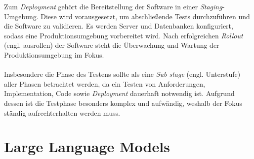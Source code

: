 Zum \textit{Deployment} gehört die Bereitstellung der Software in einer \textit{Staging}-Umgebung. Diese wird vorausgesetzt, um abschließende Tests durchzuführen und die Software zu validieren. Es werden Server und Datenbanken konfiguriert, sodass eine Produktionsumgebung vorbereitet wird. Nach erfolgreichen \textit{Rollout} (engl. ausrollen) der Software steht die Überwachung und Wartung der Produktionsumgebung im Fokus. \cite*{hossainSoftwareDevelopmentLife2023}\\\\
Insbesondere die Phase des Testens sollte als eine \textit{Sub stage} (engl. Unterstufe) aller Phasen betrachtet werden, da ein Testen von Anforderungen, Implementation, Code sowie \textit{Deployment} dauerhaft notwendig ist. Aufgrund dessen ist die Testphase besonders komplex und aufwändig, weshalb der Fokus ständig aufrechterhalten werden muss. \cite*{tikySoftwareDevelopmentLife}

\section{Large Language Models}
